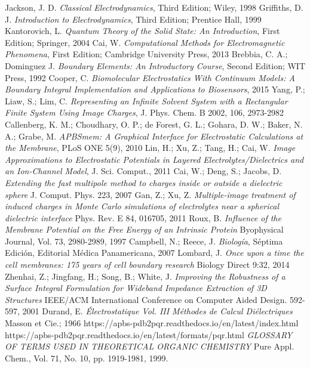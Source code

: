 \documentclass[12pt, oneside, numbers, spanish]{ezthesis}
\numberwithin{equation}{section}
\begin{document}
\begin{thebibliography}{30}
Jackson, J. D. \textit{Classical Electrodynamics}, Third Edition; Wiley, 1998
Griffiths, D. J. \textit{Introduction to Electrodynamics}, Third Edition; Prentice Hall, 1999
Kantorovich, L. \textit{Quantum Theory of the Solid State: An Introduction}, First Edition; Springer, 2004
Cai, W. \textit{Computational Methods for Electromagnetic Phenomena}, First Edition; Cambridge University Press, 2013
Brebbia, C. A.; Dominguez J. \textit{Boundary Elements: An Introductory Course}, Second Edition; WIT Press, 1992
Cooper, C. \textit{Biomolecular Electrostatics With Continuum Models: A Boundary Integral Implementation and Applications to Biosensors}, 2015
Yang, P.; Liaw, S.; Lim, C. \textit{Representing an Infinite Solvent System with a Rectangular Finite System Using Image Charges}, J. Phys. Chem. B 2002, 106, 2973-2982
Callenberg, K. M.; Choudhary, O. P.; de Forest, G. L.; Gohara, D. W.; Baker, N. A.; Grabe, M. \textit{APBSmem: A Graphical Interface for Electrostatic Calculations at the Membrane}, PLoS ONE 5(9), 2010
Lin, H.; Xu, Z.; Tang, H.; Cai, W. \textit{Image Approximations to Electrostatic Potentials in Layered Electrolytes/Dielectrics and an Ion-Channel Model}, J. Sci. Comput., 2011
Cai, W.; Deng, S.; Jacobs, D. \textit{Extending the fast multipole method to charges inside or outside a dielectric sphere} J. Comput. Phys. 223, 2007
Gan, Z.; Xu, Z. \textit{Multiple-image treatment of induced charges in Monte Carlo simulations of electrolytes near a spherical dielectric interface} Phys. Rev. E 84, 016705, 2011
Roux, B. \textit{Influence of the Membrane Potential on the Free Energy of an Intrinsic Protein} Byophysical Journal, Vol. 73, 2980-2989, 1997
Campbell, N.; Reece, J. \textit{Biología}, Séptima Edición, Editorial Médica Panamericana, 2007
Lombard, J. \textit{Once upon a time the cell membranes: 175 years of cell boundary research} Biology Direct 9:32, 2014
Zhenhai, Z.; Jingfang, H.; Song, B.; White, J. \textit{Improving the Robustness of a Surface Integral Formulation for Wideband Impedance Extraction of 3D Structures} IEEE/ACM International Conference on Computer Aided Design. 592-597, 2001 
Durand, E. \textit{Électrostatique Vol. III Méthodes de Calcul Diélectriques} Masson et Cie.; 1966
https://apbs-pdb2pqr.readthedocs.io/en/latest/index.html
https://apbs-pdb2pqr.readthedocs.io/en/latest/formats/pqr.html
\textit{GLOSSARY OF TERMS USED IN THEORETICAL ORGANIC CHEMISTRY} Pure Appl. Chem., Vol. 71, No. 10, pp. 1919-1981, 1999.
\end{thebibliography}
\end{document}
